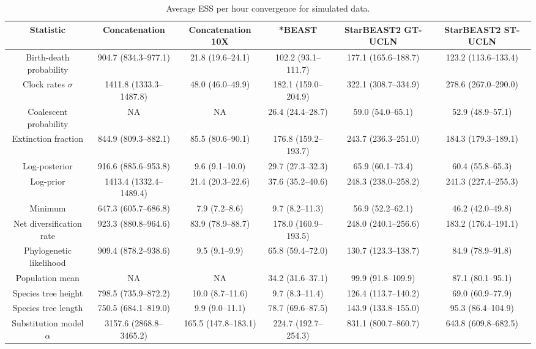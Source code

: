 \documentclass[12pt]{article}
\begin{document}
\begin{landscape}

\begin{table}[htb!]
\centering
\caption{Average ESS per hour convergence for simulated data.}
\label{tab:simulatedPerHour}
\begin{threeparttable}
\begin{adjustbox}{center}
\renewcommand{\arraystretch}{1.2}
\footnotesize
\begin{tabular}{|c|c|c|c|c|c|}
\multicolumn{1}{c}{Statistic} & \multicolumn{1}{c}{Concatenation} & \multicolumn{1}{c}{Concatenation 10X} & \multicolumn{1}{c}{*BEAST} & \multicolumn{1}{c}{StarBEAST2 GT-UCLN} & \multicolumn{1}{c}{StarBEAST2 ST-UCLN}\tabularnewline
\hline
Birth-death probability & 904.7 (834.3--977.1) & 21.8 (19.6--24.1) & 102.2 (93.1--111.7) & 177.1 (165.6--188.7) & 123.2 (113.6--133.4)\tabularnewline
\hline
Clock rates $\sigma$ & 1411.8 (1333.3--1487.8) & 48.0 (46.0--49.9) & 182.1 (159.0--204.9) & 322.1 (308.7--334.9) & 278.6 (267.0--290.0)\tabularnewline
\hline
Coalescent probability & NA & NA & 26.4 (24.4--28.7) & 59.0 (54.0--65.1) & 52.9 (48.9--57.1)\tabularnewline
\hline
Extinction fraction & 844.9 (809.3--882.1) & 85.5 (80.6--90.1) & 176.8 (159.2--193.7) & 243.7 (236.3--251.0) & 184.3 (179.3--189.1)\tabularnewline
\hline
Log-posterior & 916.6 (885.6--953.8) & 9.6 (9.1--10.0) & 29.7 (27.3--32.3) & 65.9 (60.1--73.4) & 60.4 (55.8--65.3)\tabularnewline
\hline
Log-prior & 1413.4 (1332.4--1489.4) & 21.4 (20.3--22.6) & 37.6 (35.2--40.6) & 248.3 (238.0--258.2) & 241.3 (227.4--255.3)\tabularnewline
\hline
Minimum & 647.3 (605.7--686.8) & 7.9 (7.2--8.6) & 9.7 (8.2--11.3) & 56.9 (52.2--62.1) & 46.2 (42.0--49.8)\tabularnewline
\hline
Net diversification rate & 923.3 (880.8--964.6) & 83.9 (78.9--88.7) & 178.0 (160.9--193.5) & 248.0 (240.1--256.6) & 183.2 (176.4--191.1)\tabularnewline
\hline
Phylogenetic likelihood & 909.4 (878.2--938.6) & 9.5 (9.1--9.9) & 65.8 (59.4--72.0) & 130.7 (123.3--138.7) & 84.9 (78.9--91.8)\tabularnewline
\hline
Population mean & NA & NA & 34.2 (31.6--37.1) & 99.9 (91.8--109.9) & 87.1 (80.1--95.1)\tabularnewline
\hline
Species tree height & 798.5 (735.9--872.2) & 10.0 (8.7--11.6) & 9.7 (8.3--11.4) & 126.4 (113.7--140.2) & 69.0 (60.9--77.9)\tabularnewline
\hline
Species tree length & 750.5 (684.1--819.0) & 9.9 (9.0--11.1) & 78.7 (69.6--87.5) & 143.9 (133.8--155.0) & 95.3 (86.4--104.9)\tabularnewline
\hline
Substitution model $\alpha$ & 3157.6 (2868.8--3465.2) & 165.5 (147.8--183.1) & 224.7 (192.7--254.3) & 831.1 (800.7--860.7) & 643.8 (609.8--682.5)\tabularnewline

\end{tabular}
\end{adjustbox}
\end{threeparttable}
\end{table}
\end{landscape}
\end{document}
